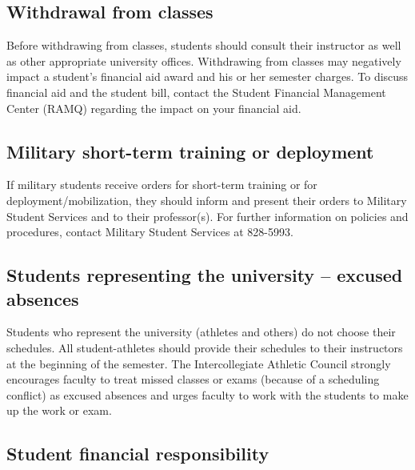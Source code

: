 \documentclass[
  letterpaper,
]{book}
\begin{document}
\subsection*{Withdrawal from classes}\label{withdrawal-from-classes}

Before withdrawing from classes, students should consult their
instructor as well as other appropriate university offices. Withdrawing
from classes may negatively impact a student's financial aid award and
his or her semester charges. To discuss financial aid and the student
bill, contact the Student Financial Management Center (RAMQ) regarding
the impact on your financial aid.

\subsection*{Military short-term training or
deployment}\label{military-short-term-training-or-deployment}

If military students receive orders for short-term training or for
deployment/mobilization, they should inform and present their orders to
Military Student Services and to their professor(s). For further
information on policies and procedures, contact Military Student
Services at 828-5993.

\subsection*{Students representing the university -- excused
absences}\label{students-representing-the-university-excused-absences}

Students who represent the university (athletes and others) do not
choose their schedules. All student-athletes should provide their
schedules to their instructors at the beginning of the semester. The
Intercollegiate Athletic Council strongly encourages faculty to treat
missed classes or exams (because of a scheduling conflict) as excused
absences and urges faculty to work with the students to make up the work
or exam.

\subsection*{Student financial
responsibility}\label{student-financial-responsibility}
\end{document}
